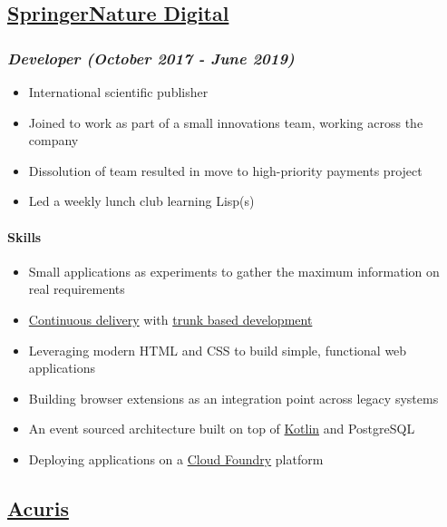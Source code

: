 \documentclass[11pt]{article}
\begin{document}
\subsection*{\href{http://www.springernature.com}{SpringerNature Digital}}
\label{sec:org92fabb0}
\subsubsection*{\emph{Developer (October 2017 - June 2019)}}
\label{sec:orgaaf95cb}
\begin{itemize}
\item International scientific publisher
\item Joined to work as part of a small innovations team, working across the company
\item Dissolution of team resulted in move to high-priority payments project
\item Led a weekly lunch club learning Lisp(s)
\end{itemize}

\paragraph*{Skills}
\label{sec:orgdf0a9c4}
\begin{itemize}
\item Small applications as experiments to gather the maximum information on real requirements
\item \href{https://continuousdelivery.com/}{Continuous delivery} with \href{https://trunkbaseddevelopment.com/}{trunk based development}
\item Leveraging modern HTML and CSS to build simple, functional web applications
\item Building browser extensions as an integration point across legacy systems
\item An event sourced architecture built on top of \href{https://kotlinlang.org/}{Kotlin} and PostgreSQL
\item Deploying applications on a \href{https://www.cloudfoundry.org/}{Cloud Foundry} platform
\end{itemize}

\subsection*{\href{http://www.acuris.com/}{Acuris}}
\label{sec:org8ce2a3e}
\end{document}
